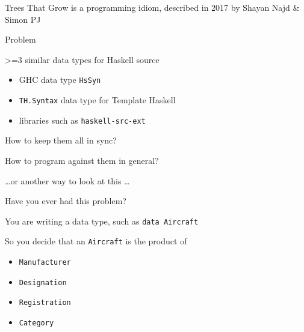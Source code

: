 \begin{frame}
\begin{center}
Trees That Grow is a programming idiom, described in 2017 by Shayan Najd \& Simon PJ\cite{najd2016trees}
\end{center}
\end{frame}

\begin{frame}
\begin{center}
Problem

>=3 similar data types for Haskell source

\begin{itemize}
\item GHC data type \lstinline{HsSyn}
\item \lstinline{TH.Syntax} data type for Template Haskell
\item libraries such as \lstinline{haskell-src-ext}
\end{itemize}
\end{center}
\end{frame}

\begin{frame}
\begin{center}
How to keep them all in sync?

How to program against them in general?
\end{center}
\end{frame}

\begin{frame}
\begin{center}
\ldots or another way to look at this \ldots
\end{center}
\end{frame}

\begin{frame}
\begin{center}
Have you ever had this problem?
\end{center}
\end{frame}

\begin{frame}
\begin{center}
You are writing a data type, such as \lstinline{data Aircraft}
\end{center}
\end{frame}

\begin{frame}
\begin{center}
So you decide that an \lstinline{Aircraft} is the product of
\end{center}
\begin{itemize}
\item \lstinline{Manufacturer}
\item \lstinline{Designation}
\item \lstinline{Registration}
\item \lstinline{Category}
\end{itemize}
\end{frame}

